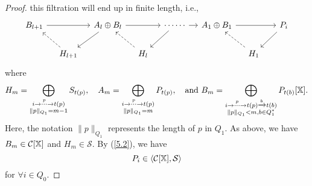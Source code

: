 \begin{proof}
  this filtration will end up in finite length, i.e.,
  \begin{equation}\label{5.2}
    \begin{tikzcd}[column sep=.9pc]
      B_{l + 1} \ar[rr]
      & & A_l \oplus B_l \ar[rr] \ar[dl]
      & & \cdots\cdots \ar[r] \ar[dl]
      & A_1 \oplus B_1 \ar[rr]
      & &[5pt] P_i\ar[dl] \\
      & H_{l+1} \ar[ul, dashed]
      & & H_l \ar[ul, dashed]
      & & & H_1\ar[ul, dashed]
    \end{tikzcd}
  \end{equation}
  where
  \[
    H_m = \bigoplus_{\substack{
      i \stackrel{p}{\to \cdots \to} t(p) \\ \|p\|_{Q_1} = m-1
    }} S_{t(p)},
    \quad A_m = \bigoplus_{\substack{
      i \stackrel{p}{\to \cdots \to} t(p) \\ \|p\|_{Q_1} = m
    }}P_{t(p)}
    , \quad \text{and}\ 
    B_m = \bigoplus_{\substack{
      i \stackrel{p}{\to \cdots \to} t(p) \xrightarrow{b} t(b)
      \\ \|p\|_{Q_1} < m, b \in Q_1^*
    }}P_{t(b)}[\XX].
  \]
  Here, the notation $\|p\|_{Q_1}$ represents the length of $p$ in $Q_1$.
  As above, we have $B_m \in \operatorname{\mathcal{C}}[\mathbb{X}]$ and $H_m \in \mathcal{S}$.
  By (\ref{5.2}), we have
  \[ P_i \in \langle \operatorname{\mathcal{C}}[\mathbb{X}], \mathcal{S} \rangle \]
  for $\forall i \in Q_0$.


\end{proof}
